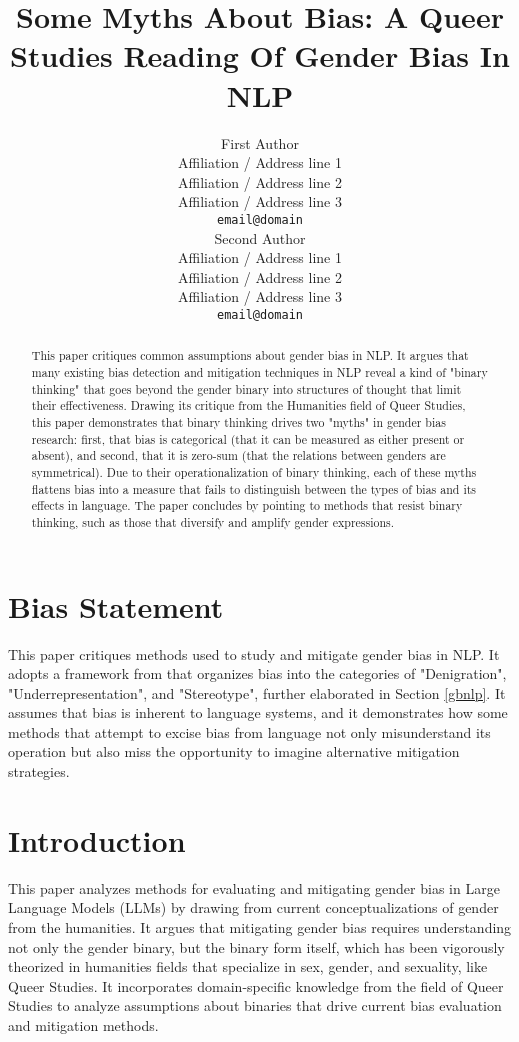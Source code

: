 \documentclass[11pt]{article}
\title{Some Myths About Bias: A Queer Studies Reading Of Gender Bias In NLP}
\author{First Author \\
  Affiliation / Address line 1 \\
  Affiliation / Address line 2 \\
  Affiliation / Address line 3 \\
  \texttt{email@domain} \\\And
  Second Author \\
  Affiliation / Address line 1 \\
  Affiliation / Address line 2 \\
  Affiliation / Address line 3 \\
  \texttt{email@domain} \\}
\begin{document}
\maketitle
\begin{abstract}
This paper critiques common assumptions about gender bias in NLP. It
argues that many existing bias detection and mitigation techniques in
NLP reveal a kind of "binary thinking" that goes beyond the gender
binary into structures of thought that limit their effectiveness. Drawing its critique from the Humanities field of Queer
Studies, this paper demonstrates that binary thinking drives two "myths" in
gender bias research: first, that bias is categorical (that it can be
measured as either present or absent), and second, that it is zero-sum
(that the relations between genders are symmetrical). Due to their
operationalization of binary thinking, each of these myths 
flattens bias into a measure that fails to distinguish between the
types of bias and its effects in language. The paper concludes by pointing
to methods that resist binary thinking, such as those that diversify
and amplify gender expressions.
\end{abstract}

\section{Bias Statement}
This paper critiques methods used to study and mitigate gender bias in
NLP. It adopts a framework from \citet{nemani:2023} that organizes
bias into the categories of "Denigration", "Underrepresentation", and
"Stereotype", further elaborated in Section \ref{gbnlp}. It assumes
that bias is inherent to language systems, and it demonstrates how
some methods that attempt to excise bias from language not only
misunderstand its operation but also miss the opportunity to imagine
alternative mitigation strategies.

\section{Introduction}
This paper analyzes methods for evaluating and mitigating gender bias
in Large Language Models (LLMs) by drawing from current
conceptualizations of gender from the humanities. It argues that
mitigating gender bias requires understanding not only the gender
binary, but the binary form itself, which has been vigorously
theorized in humanities fields that specialize in sex, gender, and
sexuality, like Queer Studies. It incorporates domain-specific
knowledge from the field of Queer Studies to analyze assumptions about
binaries that drive current bias evaluation and mitigation methods.
\end{document}
